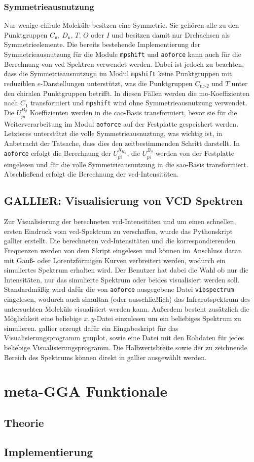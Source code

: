 	
	\subsubsection{Symmetrieausnutzung}
	Nur wenige chirale Moleküle besitzen eine Symmetrie. Sie gehören alle zu den Punktgruppen $C_{\textrm{n}}$, $D_{\textrm{n}}$, $T$, $O$ oder $I$ und besitzen damit nur Drehachsen als Symmetrieelemente. Die bereits bestehende Implementierung der Symmetrieausnutzung\supercite{haser1991molecular} für die Module \texttt{mpshift} und \texttt{aoforce} kann auch für die Berechnung von \ac{vcd} Spektren verwendet werden. Dabei ist jedoch zu beachten, dass die Symmetrieausnutzugn im Modul \texttt{mpshift} keine Punktgruppen mit reduziblen $e$-Darstellungen unterstützt, was die Punktgruppen $C_{\textrm{n>2}}$ und $T$ unter den chiralen Punktgruppen betrifft. In diesen Fällen werden die \ac{mo}-Koeffizienten nach $C_1$ transformiert und \texttt{mpshift} wird ohne Symmetrieausnutzung verwendet. Die $U_{pi}^{B_\beta}$ Koeffizienten werden in die \ac{cao}-Basis transformiert, bevor sie für die Weiterverarbeitung im Modul \texttt{aoforce} auf der Festplatte gespeichert werden. Letzteres unterstützt die volle Symmetrieausnuztung, was wichtig ist, in Anbetracht der Tatsache, dass dies den zeitbestimmenden Schritt darstellt. In \texttt{aoforce} erfolgt die Berechnung der $U_{pi}^{R_{K_\alpha}}$, die $U_{pi}^{B_\beta}$ werden von der Festplatte eingelesen und für die volle Symmetrieausnutzung in die \ac{sao}-Basis transformiert. Abschließend erfolgt die Berechnung der \ac{vcd}-Intensitäten. 
	\subsection{GALLIER: Visualisierung von VCD Spektren}
	Zur Visualisierung der berechneten \ac{vcd}-Intensitäten und um einen schnellen, ersten Eindruck vom \ac{vcd}-Spektrum zu verschaffen, wurde das Pythonskript \ac{gallier} erstellt. Die berechneten \ac{vcd}-Intensitäten und die korrespondierenden Frequenzen werden von dem Skript eingelesen und können im Anschluss daran mit Gauß- oder Lorentzförmigen Kurven verbreitert werden, wodurch ein simuliertes Spektrum erhalten wird. Der Benutzer hat dabei die Wahl ob nur die Intensitäten, nur das simulierte Spektrum oder beides visualisiert werden soll. Standardmäßig wird dafür die von \texttt{aoforce} ausgegebene Datei \texttt{vibspectrum} eingelesen, wodurch auch simultan (oder ausschließlich) das Infrarotspektrum des untersuchten Moleküls visualisiert werden kann. Außerdem besteht zusätzlich die Möglichkeit eine beliebige $x,y$-Datei einzulesen um ein beliebiges Spektrum zu simulieren. \ac{gallier} erzeugt dafür ein Eingabeskript für das Visualisierungsprogramm gnuplot\supercite{gnuplot}, sowie eine Datei mit den Rohdaten für jedes beliebige Visualisierungsprogramm. Die Halbwertsbreite sowie der zu zeichnende Bereich des Spektrums können direkt in \ac{gallier} ausgewählt werden.
\section{meta-GGA Funktionale}
	\subsection{Theorie}
	\subsection{Implementierung}
	
	